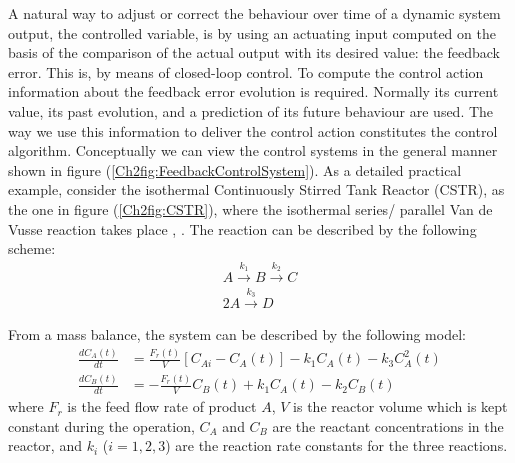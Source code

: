 A natural way to adjust or correct the behaviour over time of a dynamic system output, the controlled variable, is by using an actuating input computed on the basis of the comparison of the actual output with its desired value: the feedback error. This is, by means of closed-loop control. To compute the control action information about the feedback error evolution is required. Normally its current value, its past evolution, and a prediction of its future behaviour are used. The way we use this information to deliver the control action constitutes the control algorithm. Conceptually we can view the control systems in the general manner shown in figure (\ref{Ch2fig:FeedbackControlSystem}). As a detailed  practical example, consider the isothermal Continuously Stirred Tank Reactor (CSTR), as the one in figure (\ref{Ch2fig:CSTR}), where the isothermal series/ parallel Van de Vusse reaction takes place \citep{arrietaETFA2008}, \citep{VandeVusse2} . The reaction can be described by the following scheme:
%
\begin{align}
    A \overset{k_1}{\longrightarrow} B \overset{k_2}{\longrightarrow}C\\
    2 A \overset{k_3}{\longrightarrow} D \nonumber
\end{align}
%

From a mass balance, the system can be described by the following model:
%
\begin{align}
    \frac{dC_A(t)}{dt} & = \frac{F_r(t)}{V} \left[C_{Ai}-C_A(t)\right] - k_1 C_A(t) - k_3 C^2_A(t) \nonumber \\
    \frac{dC_B(t)}{dt} & = -\frac{F_r(t)}{V} C_B(t)+ k_1 C_A(t) - k_2 C_B(t)
    \label{Ch2eq:system3}
\end{align}
%
where $F_r$ is the feed flow rate of product $A$, $V$ is the reactor volume which is kept constant during the operation, $C_A$ and $C_B$ are the reactant concentrations in the reactor, and $k_i$ ($i=1,2,3$) are the reaction rate constants for the three reactions.

